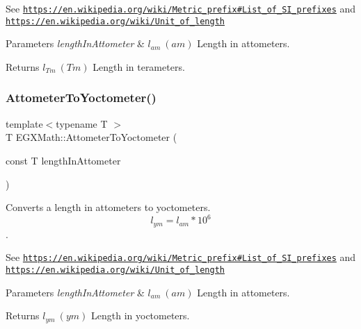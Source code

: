 See \href{https://en.wikipedia.org/wiki/Metric_prefix#List_of_SI_prefixes}{\tt https\+://en.\+wikipedia.\+org/wiki/\+Metric\+\_\+prefix\#\+List\+\_\+of\+\_\+\+S\+I\+\_\+prefixes} and \href{https://en.wikipedia.org/wiki/Unit_of_length}{\tt https\+://en.\+wikipedia.\+org/wiki/\+Unit\+\_\+of\+\_\+length} 
\begin{DoxyParams}{Parameters}
{\em length\+In\+Attometer} & $ l_{am}\ (am)$ Length in attometers. \\
\hline
\end{DoxyParams}
\begin{DoxyReturn}{Returns}
$ l_{Tm}\ (Tm)$ Length in terameters. 
\end{DoxyReturn}
\mbox{\label{group___e_g_x_math-_conversions-_length_conversions-_attometer-_s_i_gaf325d426b8544c973b0f140b0d4e0f06}} 
\subsubsection{\texorpdfstring{Attometer\+To\+Yoctometer()}{AttometerToYoctometer()}}
{\footnotesize\ttfamily template$<$typename T $>$ \\
T E\+G\+X\+Math\+::\+Attometer\+To\+Yoctometer (\begin{DoxyParamCaption}\item[{const T}]{length\+In\+Attometer }\end{DoxyParamCaption})}



Converts a length in attometers to yoctometers. \[ l_{ym}=l_{am} * 10^{6} \]. 

See \href{https://en.wikipedia.org/wiki/Metric_prefix#List_of_SI_prefixes}{\tt https\+://en.\+wikipedia.\+org/wiki/\+Metric\+\_\+prefix\#\+List\+\_\+of\+\_\+\+S\+I\+\_\+prefixes} and \href{https://en.wikipedia.org/wiki/Unit_of_length}{\tt https\+://en.\+wikipedia.\+org/wiki/\+Unit\+\_\+of\+\_\+length} 
\begin{DoxyParams}{Parameters}
{\em length\+In\+Attometer} & $ l_{am}\ (am)$ Length in attometers. \\
\hline
\end{DoxyParams}
\begin{DoxyReturn}{Returns}
$ l_{ym}\ (ym)$ Length in yoctometers. 
\end{DoxyReturn}
\mbox{\label{group___e_g_x_math-_conversions-_length_conversions-_attometer-_s_i_gaaa5d4078879169021c8f2857c02a7aed}} 
